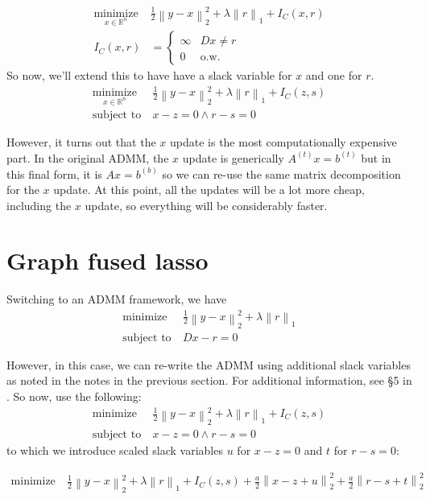 \documentclass{article}
\newcommand{\op}[2]{{\ensuremath{\underset{ #2 }{\operatorname{ #1 }}~}}}
\newcommand{\norm}[1]{{ \ensuremath{ \left\lVert  #1 \right\rVert  }  }}
\begin{document}
\begin{align*}
\op{minimize}{x\in \mathbb{R}^n}&  \frac{1}{2}\norm{y-x}_2^2 + \lambda \norm{r}_1+I_C(x,r)\\
I_C(x,r)&=\left\{
\begin{matrix}
\infty & Dx\neq r\\
0 & \textrm{o.w.}
\end{matrix}
\right.
\end{align*}
So now, we'll extend this to have have a slack variable for $x$ and one for $r$.
\begin{align*}
\op{minimize}{x\in \mathbb{R}^n}&  \frac{1}{2}\norm{y-x}_2^2 + \lambda \norm{r}_1+I_C(z,s)\\
\textrm{subject to}~& x-z=0 \wedge r-s=0
\end{align*}

However, it turns out that the $x$ update is the most computationally expensive
part. In the original ADMM, the $x$ update is generically $A^{(t)}x=b^{(t)}$
but in this final form, it is $Ax=b^{(b)}$ so we can re-use the same
matrix decomposition for the $x$ update. At this point, all the updates
will be a lot more cheap, including the $x$ update, so everything will be considerably faster.



\section{Graph fused lasso}
Switching to an ADMM framework, we have
\begin{align*}
\op{minimize}{~}&  \frac{1}{2}\norm{y-x}_2^2 + \lambda \norm{r}_1\\
\textrm{subject to}~& Dx-r=0
\end{align*}

However, in this case, we can re-write the ADMM using additional slack
variables as noted in the notes in the previous section. For additional
information, see \S5 in \cite{tansey2014false}. So now, use the following:
\begin{align*}
\op{minimize}{~}&  \frac{1}{2}\norm{y-x}_2^2 + \lambda \norm{r}_1+I_C(z,s)\\
\textrm{subject to}~& x-z=0 \wedge r-s=0
\end{align*}
to which we introduce scaled slack variables $u$ for $x-z=0$ and $t$ for $r-s=0$:

\begin{align*}
\op{minimize}{~}&  \frac{1}{2}\norm{y-x}_2^2 + \lambda \norm{r}_1+I_C(z,s) + \frac{a}{2}\norm{x-z+u}_2^2+\frac{a}{2}\norm{r-s+t}_2^2
\end{align*}
\end{document}
